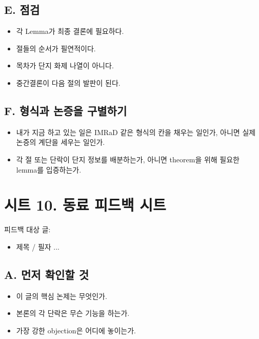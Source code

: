 \subsection{E. 점검}\label{e-uxc810uxac80-1}

\begin{itemize}
\tightlist
\item[$\square$]
  각 Lemma가 최종 결론에 필요하다.
\item[$\square$]
  절들의 순서가 필연적이다.
\item[$\square$]
  목차가 단지 화제 나열이 아니다.
\item[$\square$]
  중간결론이 다음 절의 발판이 된다.
\end{itemize}

\subsection{F. 형식과 논증을 구별하기}\label{f-uxd615uxc2dduxacfc-uxb17cuxc99duxc744-uxad6cuxbcc4uxd558uxae30}

\begin{itemize}
\tightlist
\item
  내가 지금 하고 있는 일은 IMRaD 같은 형식의 칸을 채우는 일인가, 아니면 실제 논증의 계단을 세우는 일인가.
\item
  각 절 또는 단락이 단지 정보를 배분하는가, 아니면 theorem을 위해 필요한 lemma를 입증하는가.
\end{itemize}

\section{시트 10. 동료 피드백 시트}\label{uxc2dcuxd2b8-10-uxb3d9uxb8cc-uxd53cuxb4dcuxbc31-uxc2dcuxd2b8}

피드백 대상 글:

\begin{itemize}
\tightlist
\item
  제목 / 필자 ...
\end{itemize}

\subsection{A. 먼저 확인할 것}\label{a-uxba3cuxc800-uxd655uxc778uxd560-uxac83}

\begin{itemize}
\tightlist
\item
  이 글의 핵심 논제는 무엇인가.
\item
  본론의 각 단락은 무슨 기능을 하는가.
\item
  가장 강한 objection은 어디에 놓이는가.
\end{itemize}

